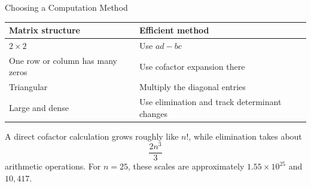 \begin{frame}{Choosing a Computation Method}
\small
\renewcommand{\arraystretch}{1.35}
\begin{center}
\begin{tabular}{>{\raggedright\arraybackslash}p{.40\linewidth}>{\raggedright\arraybackslash}p{.48\linewidth}}
\toprule
Matrix structure & Efficient method \\
\midrule
$2\times2$ & Use $ad-bc$ \\
One row or column has many zeros & Use cofactor expansion there \\
Triangular & Multiply the diagonal entries \\
Large and dense & Use elimination and track determinant changes \\
\bottomrule
\end{tabular}
\end{center}
\pause
A direct cofactor calculation grows roughly like $n!$, while elimination takes about
\[
\frac{2n^3}{3}
\]
arithmetic operations. For $n=25$, these scales are approximately $1.55\times10^{25}$ and $10{,}417$.
\end{frame}
